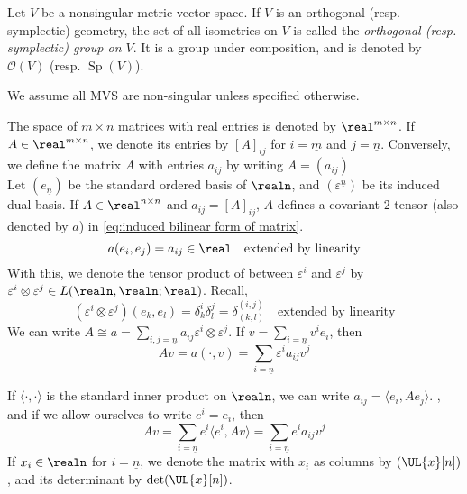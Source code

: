 \documentclass[../main-v2-manifolds.tex]{subfiles}
\begin{document}
    \begin{definition}
        Let $V$ be a nonsingular metric vector space. If $V$ is an orthogonal (resp. symplectic) geometry, the set of all isometries on $V$ is called the \emph{orthogonal (resp. symplectic) group on $V$}. It is a group under composition, and is denoted by $\mathcal{O}(V)$ (resp. $\operatorname{Sp}(V)$).
    \end{definition}
    \begin{remark}
        We assume all MVS are non-singular unless specified otherwise.
    \end{remark}
The space of $m\times n$ matrices with real entries is denoted by $\real^{m\times n}$. If $A\in\real^{m\times n}$, we denote its entries by $[A]_{ij}$ for $i=\underline{m}$ and $j = \underline{n}$. Conversely, we define the matrix $A$ with entries $a_{ij}$ by writing $A = (a_{ij})$\\

Let $(e_{\underline{n}})$ be the standard ordered basis of $\realn$, and $(\varepsilon^{\underline{n}})$ be its induced dual basis. If $A\in\real^{n\times n}$ and $a_{ij} = [A]_{ij}$, $A$ defines a covariant $2$-tensor (also denoted by $a$) in \cref{eq:induced bilinear form of matrix}.
\begin{equation}
    a(e_i,e_j) = a_{ij}\in\real\quad\text{extended by linearity}
    \label{eq:induced bilinear form of matrix}
\end{equation}
With this, we denote the tensor product of between $\varepsilon^i$ and $\varepsilon^j$ by $\varepsilon^i\otimes \varepsilon^j\in L(\realn,\realn;\real)$. Recall,
\begin{equation}
    (\varepsilon^i\otimes \varepsilon^j)(e_k,e_l) = \delta^i_k\delta^j_l=\delta^{(i,j)}_{(k,l)}\quad\text{extended by linearity}
    \label{eq:tensor-product-dual-basis}
\end{equation}
We can write $A\cong a = \sum_{i,j=\underline{n}}a_{ij}\varepsilon^i\otimes\varepsilon^j$. If $v = \sum_{i=\underline{n}} v^i e_i$, then
\[
Av = a(\cdot, v)= \sum_{i=\underline{n}} \varepsilon^i a_{ij}v^j
\]

If $\langle \cdot,\cdot\rangle$ is the standard inner product on $\realn$, we can write $a_{ij} = \langle e_i, Ae_j\rangle$. , and if we allow ourselves to write $e^i = e_i$, then
\[
    Av = \sum_{i=\underline{n}}e^i\langle e^i, Av\rangle = \sum_{i=\underline{n}}e^i a_{ij} v^j
\]
If $x_i\in\realn$ for $i = \underline{n}$, we denote the matrix with $x_i$ as columns by $(\UL{x}[n])$, and its determinant by $\det(\UL{x}[n])$.
\end{document}
